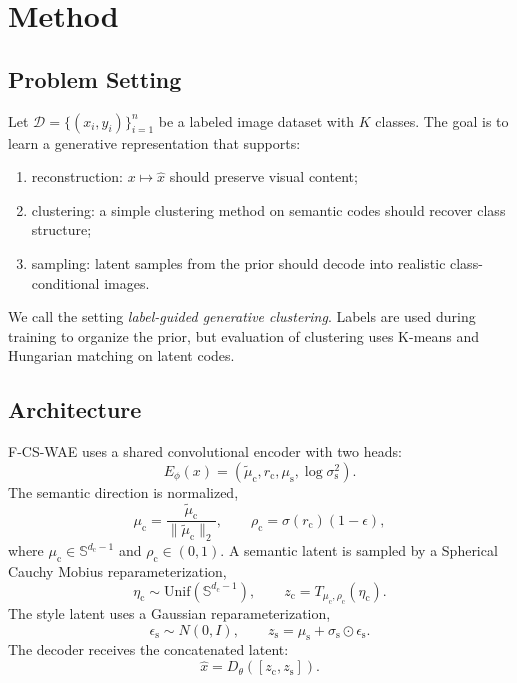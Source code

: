 \documentclass[10pt]{article}
\newcommand{\ours}{F-CS-WAE}
\newcommand{\zc}{z_{\mathrm{c}}}
\newcommand{\zs}{z_{\mathrm{s}}}
\newcommand{\Sph}{\mathbb{S}}
\begin{document}
\section{Method}

\subsection{Problem Setting}

Let $\mathcal{D}=\{(x_i,y_i)\}_{i=1}^{n}$ be a labeled image dataset with $K$ classes. The goal is to learn a generative representation that supports:
\begin{enumerate}
    \item reconstruction: $x\mapsto \hat{x}$ should preserve visual content;
    \item clustering: a simple clustering method on semantic codes should recover class structure;
    \item sampling: latent samples from the prior should decode into realistic class-conditional images.
\end{enumerate}
We call the setting \emph{label-guided generative clustering}. Labels are used during training to organize the prior, but evaluation of clustering uses K-means and Hungarian matching on latent codes.

\subsection{Architecture}

\ours{} uses a shared convolutional encoder with two heads:
\begin{equation}
    E_\phi(x) = (\tilde{\mu}_{\mathrm{c}}, r_{\mathrm{c}},
    \mu_{\mathrm{s}}, \log\sigma_{\mathrm{s}}^2).
\end{equation}
The semantic direction is normalized,
\begin{equation}
    \mu_{\mathrm{c}} =
    \frac{\tilde{\mu}_{\mathrm{c}}}{\|\tilde{\mu}_{\mathrm{c}}\|_2},
    \qquad
    \rho_{\mathrm{c}} = \sigma(r_{\mathrm{c}})(1-\epsilon),
\end{equation}
where $\mu_{\mathrm{c}}\in\Sph^{d_{\mathrm{c}}-1}$ and $\rho_{\mathrm{c}}\in(0,1)$. A semantic latent is sampled by a Spherical Cauchy Mobius reparameterization,
\begin{equation}
    \eta_{\mathrm{c}}\sim \mathrm{Unif}(\Sph^{d_{\mathrm{c}}-1}),
    \qquad
    \zc = T_{\mu_{\mathrm{c}},\rho_{\mathrm{c}}}(\eta_{\mathrm{c}}).
\end{equation}
The style latent uses a Gaussian reparameterization,
\begin{equation}
    \epsilon_{\mathrm{s}}\sim N(0,I), \qquad
    \zs = \mu_{\mathrm{s}} + \sigma_{\mathrm{s}}\odot \epsilon_{\mathrm{s}}.
\end{equation}
The decoder receives the concatenated latent:
\begin{equation}
    \hat{x}=D_\theta([\zc,\zs]).
\end{equation}
\end{document}

